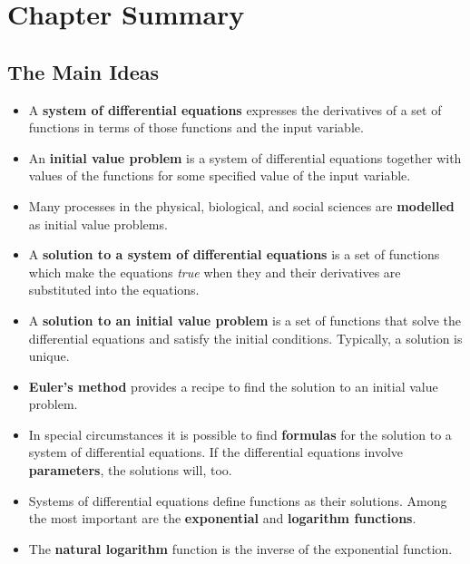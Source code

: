\section{Chapter Summary}
\label{sec:chapter-summary}


\subsection{The Main Ideas}
\label{subsec:the-main-ideas}

\begin{itemize}

\item  A {\bf system of differential equations} expresses the derivatives of a set of functions in terms of those  functions and the input variable.  

\item  An {\bf initial value problem} is a system of differential equations together with values of the functions for some specified value of the input variable.  

\item  Many processes in the physical, biological, and social sciences are {\bf modelled} as initial value problems.

\item  A {\bf solution to a system of differential equations} is a set of functions which make the equations {\em true\/} when they and their derivatives are substituted into the equations.

\item  A {\bf solution to an initial value problem} is a set of functions that solve the differential equations and satisfy the initial conditions.  Typically, a solution is unique.

\item  {\bf Euler's method} provides a recipe to find the solution to an initial value problem.   

\item  In special circumstances it is possible to find {\bf formulas} for the solution to a system of differential equations.  If the differential equations involve {\bf parameters}, the solutions will, too.

\item  Systems of differential equations define functions as their solutions.  Among the most important are the {\bf exponential} and {\bf logarithm functions}.

\item  The {\bf natural logarithm} function is the inverse of the exponential function.  


\end{itemize}
